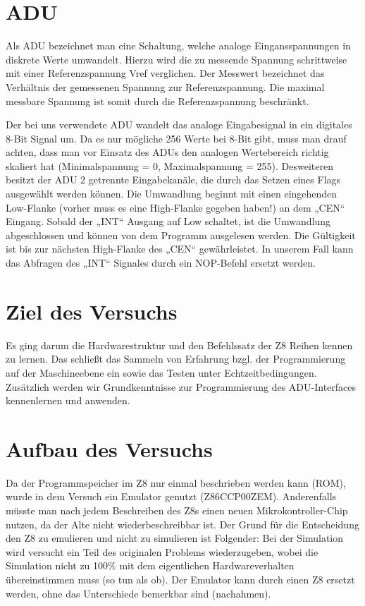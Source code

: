\documentclass[a4paper,11pt]{article}
\begin{document}
\section{ADU}
Als ADU bezeichnet man eine Schaltung, welche analoge Eingansspannungen in diskrete Werte umwandelt. Hierzu wird die zu messende Spannung schrittweise mit einer Referenzspannung Vref verglichen. Der Messwert bezeichnet das Verhältnis der gemessenen Spannung zur Referenzspannung. Die maximal messbare Spannung ist somit durch die Referenzspannung beschränkt.

Der bei uns verwendete ADU wandelt das analoge Eingabesignal in ein digitales 8-Bit Signal um. Da es nur mögliche 256 Werte bei 8-Bit gibt, muss man drauf achten, dass man vor Einsatz des ADUs den analogen Wertebereich richtig skaliert hat (Minimalspannung = 0, Maximalspannung = 255).
Desweiteren  besitzt der ADU 2 getrennte Eingabekanäle, die durch das Setzen eines Flags ausgewählt werden können. 
Die Umwandlung beginnt mit einen eingehenden Low-Flanke (vorher muss es eine High-Flanke gegeben haben!) an dem „CEN“ Eingang. Sobald der „INT“ Ausgang auf Low schaltet, ist die Umwandlung abgeschlossen und können von dem Programm ausgelesen werden. 
Die Gültigkeit ist bis zur nächsten High-Flanke des „CEN“ gewährleistet. In unserem Fall kann das Abfragen des „INT“ Signales durch ein NOP-Befehl ersetzt werden.

\section{Ziel des Versuchs}
Es ging darum die Hardwarestruktur und den Befehlssatz der Z8 Reihen kennen zu lernen. Das schließt das Sammeln von Erfahrung bzgl. der Programmierung auf der Maschineebene ein sowie das Testen unter Echtzeitbedingungen. 
Zusätzlich werden wir Grundkenntnisse zur Programmierung des ADU-Interfaces kennenlernen und anwenden.

\section{Aufbau des Versuchs}
Da der Programmspeicher im Z8 nur einmal beschrieben werden kann (ROM), wurde in dem Versuch ein Emulator genutzt (Z86CCP00ZEM). Anderenfalls müsste man nach jedem Beschreiben des Z8s einen neuen Mikrokontroller-Chip nutzen, da der Alte nicht wiederbeschreibbar ist. 
Der Grund für die Entscheidung den Z8 zu emulieren und nicht zu simulieren ist Folgender: 
Bei der Simulation wird versucht ein Teil des originalen Problems wiederzugeben, wobei die Simulation nicht zu 100\% mit dem eigentlichen Hardwareverhalten übereinstimmen muss (so tun als ob). 
Der Emulator kann durch einen Z8 ersetzt werden, ohne das Unterschiede bemerkbar sind (nachahmen).
\end{document}
